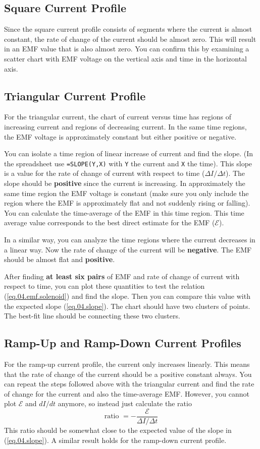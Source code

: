 \subsection{Square Current Profile}
%
Since the square current profile consists of segments where the current is almost constant, the rate of change of the current should be almost zero. This will result in an EMF value that is also almost zero. You can confirm this by examining a scatter chart with EMF voltage on the vertical axis and time in the horizontal axis.
%
\subsection{Triangular Current Profile}
%
For the triangular current, the chart of current versus time has regions of increasing current and regions of decreasing current. In the same time regions, the EMF voltage is approximately constant but either positive or negative.

You can isolate a time region of linear increase of current and find the slope. (In the spreadsheet use \texttt{=SLOPE(Y,X)} with \texttt{Y} the current and \texttt{X} the time). This slope is a value for the rate of change of current with respect to time ($\Delta I / \Delta t$). The slope should be \textbf{positive} since the current is increasing. In approximately the same time region the EMF voltage is constant (make sure you only include the region where the EMF is approximately flat and not suddenly rising or falling). You can calculate the time-average of the EMF in this time region. This time average value corresponds to the best direct estimate for the EMF ($\mathcal{E}$).

In a similar way, you can analyze the time regions where the current decreases in a linear way. Now the rate of change of the current will be \textbf{negative}. The EMF should be almost flat and \textbf{positive}.

After finding \textbf{at least six pairs} of EMF and rate of change of current with respect to time, you can plot these quantities to test the relation (\ref{eq.04.emf.solenoid}) and find the slope. Then you can compare this value with the expected slope (\ref{eq.04.slope}). The chart should have two clusters of points. The best-fit line should be connecting these two clusters.
%
\subsection{Ramp-Up and Ramp-Down Current Profiles}
%
For the ramp-up current profile, the current only increases linearly. This means that the rate of change of the current should be a positive constant always. You can repeat the steps followed above with the triangular current and find the rate of change for the current and also the time-average EMF. However, you cannot plot $\mathcal{E}$ and $dI/dt$ anymore, so instead just calculate the ratio
\begin{equation}
	\text{ratio } = -\frac{\mathcal{E}}{\Delta I/\Delta t}
	\label{eq.04.ratio}
\end{equation}
This ratio should be somewhat close to the expected value of the slope in (\ref{eq.04.slope}). A similar result holds for the ramp-down current profile.
%
